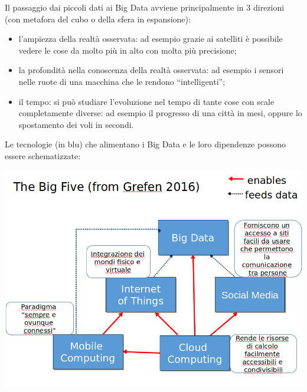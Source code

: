 \documentclass[a4page, 11pt]{article}
\begin{document}
Il passaggio dai piccoli dati ai Big Data avviene principalmente in 3 direzioni (con metafora del cubo o della sfera in espansione):
\begin{itemize}[noitemsep]
  \item l'ampiezza della realtà osservata: ad esempio grazie ai satelliti è possibile vedere le cose da molto più in alto con molta più precisione;
  \item la profondità nella conoscenza della realtà osservata: ad esempio i sensori nelle ruote di una macchina che le rendono ``intelligenti'';
  \item il tempo: si può studiare l'evoluzione nel tempo di tante cose con scale completamente diverse: ad esempio il progresso di una città in 	mesi, oppure lo spostamento dei voli in secondi.
\end{itemize}
Le tecnologie (in blu) che alimentano i Big Data e le loro dipendenze possono essere schematizzate:
\begin{center}
	\includegraphics[scale=0.39]{image7.png}
\end{center}
\end{document}
